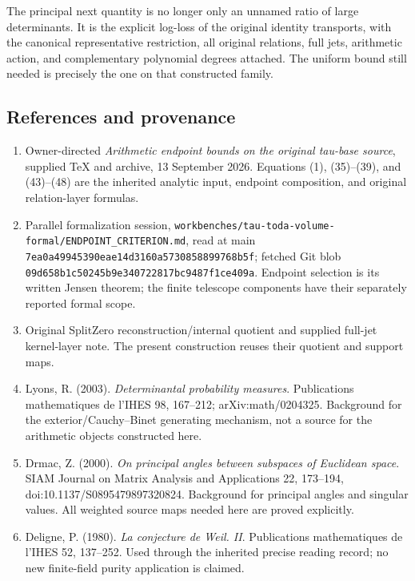 The principal next quantity is no longer only an unnamed ratio of large determinants. It is the explicit log-loss of the original identity transports, with the canonical representative restriction, all original relations, full jets, arithmetic action, and complementary polynomial degrees attached. The uniform bound still needed is precisely the one on that constructed family.

\subsection{References and provenance}\label{endpoint-restriction_original--references-and-provenance}

\begin{enumerate}
\def\labelenumi{\arabic{enumi}.}
\tightlist
\item
  Owner-directed \emph{Arithmetic endpoint bounds on the original tau-base source}, supplied TeX and archive, 13 September 2026. Equations (1), (35)--(39), and (43)--(48) are the inherited analytic input, endpoint composition, and original relation-layer formulas.
\item
  Parallel formalization session, \nolinkurl{workbenches/tau-toda-volume-formal/ENDPOINT_CRITERION.md}, read at main \nolinkurl{7ea0a49945390eae14d3160a5730858899768b5f}; fetched Git blob \nolinkurl{09d658b1c50245b9e340722817bc9487f1ce409a}. Endpoint selection is its written Jensen theorem; the finite telescope components have their separately reported formal scope.
\item
  Original SplitZero reconstruction/internal quotient and supplied full-jet kernel-layer note. The present construction reuses their quotient and support maps.
\item
  Lyons, R. (2003). \emph{Determinantal probability measures}. Publications mathematiques de l'IHES 98, 167--212; arXiv:math/0204325. Background for the exterior/Cauchy--Binet generating mechanism, not a source for the arithmetic objects constructed here.
\item
  Drmac, Z. (2000). \emph{On principal angles between subspaces of Euclidean space}. SIAM Journal on Matrix Analysis and Applications 22, 173--194, doi:10.1137/S0895479897320824. Background for principal angles and singular values. All weighted source maps needed here are proved explicitly.
\item
  Deligne, P. (1980). \emph{La conjecture de Weil. II}. Publications mathematiques de l'IHES 52, 137--252. Used through the inherited precise reading record; no new finite-field purity application is claimed.
\end{enumerate}
